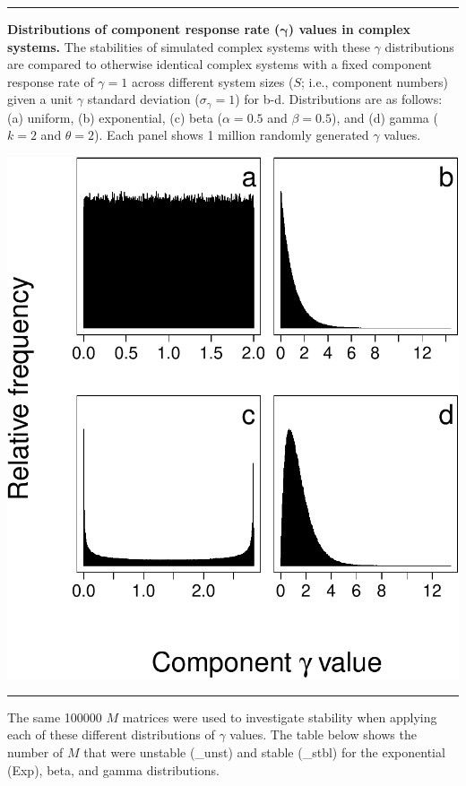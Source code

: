 \documentclass[]{article}
\begin{document}
\begin{center}\rule{0.5\linewidth}{\linethickness}\end{center}

\textbf{Distributions of component response rate
(\(\boldsymbol{\gamma}\)) values in complex systems.} The stabilities of
simulated complex systems with these \(\gamma\) distributions are
compared to otherwise identical complex systems with a fixed component
response rate of \(\gamma = 1\) across different system sizes (\(S\);
i.e., component numbers) given a unit \(\gamma\) standard deviation
(\(\sigma_{\gamma} = 1\)) for b-d. Distributions are as follows: (a)
uniform, (b) exponential, (c) beta (\(\alpha = 0.5\) and
\(\beta = 0.5\)), and (d) gamma (\(k = 2\) and \(\theta = 2\)). Each
panel shows 1 million randomly generated \(\gamma\) values.

\includegraphics{SI_science_files/figure-latex/unnamed-chunk-24-1.pdf}

\begin{center}\rule{0.5\linewidth}{\linethickness}\end{center}

The same 100000 \(M\) matrices were used to investigate stability when
applying each of these different distributions of \(\gamma\) values. The
table below shows the number of \(M\) that were unstable (\_unst) and
stable (\_stbl) for the exponential (Exp), beta, and gamma
distributions.
\end{document}
